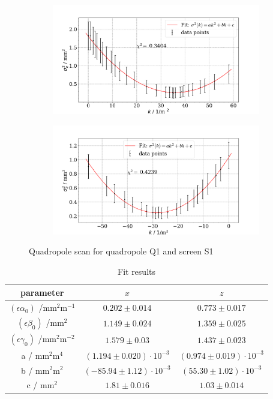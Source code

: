 \documentclass[11pt,a4paper,notitlepage]{scrartcl}
\begin{document}
\begin{figure}[htbp]
	\centering
	\begin{subfigure}{.49\linewidth}
		\includegraphics[width=\linewidth]{qscan_q1_x}
	\end{subfigure}
	\begin{subfigure}{.49\linewidth}
		\includegraphics[width=\linewidth]{qscan_q1_z}
	\end{subfigure}
	\caption{Quadropole scan for quadropole Q1 and screen S1}
	\label{fig:qscan1}
\end{figure}
\begin{table}[htbp]
	\centering
	\begin{tabular}{c||cc}
		parameter& $x$& $z$\\
		\hline
		\hline

		$(\epsilon\alpha_0)$ /$\si{\milli\m^2\m^{-1}}$ &$0.202\pm0.014$ & $0.773\pm0.017$\\
		$(\epsilon\beta_0)$ /$\si{\milli\m^2}$ &$1.149\pm0.024$ & $1.359\pm0.025$\\
		$(\epsilon\gamma_0)$ /$\si{\milli\m^2\m^{-2}}$ &$1.579\pm0.03$ &$1.437\pm0.023$\\
		\hline
		\hline

		a / $\si{\milli\m^2\m^4}$ &$(1.194\pm0.020)\cdot10^{-3}$ &$(0.974\pm0.019)\cdot10^{-3}$ \\
		b / $\si{\milli\m^2\m^2}$&$(-85.94\pm1.12)\cdot10^{-3}$ &$(55.30\pm1.02)\cdot10^{-3}$\\
		c / $\si{\milli\m^2}$ &$1.81\pm0.016$ &$1.03\pm0.014$\\
	
		
	\end{tabular}
\caption{Fit results}
\label{tab:fitres1}
\end{table}
\end{document}
